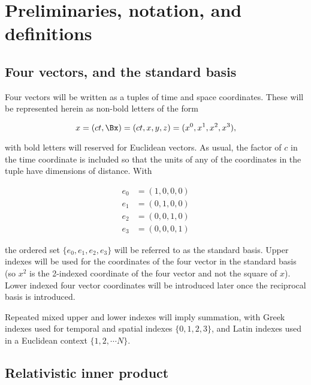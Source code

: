 
\section{Preliminaries, notation, and definitions}

\subsection{Four vectors, and the standard basis}

Four vectors will be written as a tuples of time and space coordinates.  These will be represented herein as non-bold letters of the form

\begin{equation}\label{eqn:gramSchmidtLorentz:10}
x = (c t, \Bx) = ( c t, x, y, z ) = ( x^0, x^1, x^2, x^3 ),
\end{equation}

with bold letters will reserved for Euclidean vectors.  As usual, the factor of $c$ in the time coordinate is included so that the units of any of the coordinates in the tuple have dimensions of distance.  With

\begin{equation}\label{eqn:gramSchmidtLorentz:70}
\begin{aligned}
e_0 &= (1, 0, 0, 0) \\
e_1 &= (0, 1, 0, 0) \\
e_2 &= (0, 0, 1, 0) \\
e_3 &= (0, 0, 0, 1)
\end{aligned}
\end{equation}

the ordered set $\{e_0, e_1, e_2, e_3\}$ will be referred to as the standard basis.  Upper indexes will be used for the coordinates of the four vector in the standard basis (so $x^2$ is the 2-indexed coordinate of the four vector and not the square of $x$).  Lower indexed four vector coordinates will be introduced later once the reciprocal basis is introduced.

Repeated mixed upper and lower indexes will imply summation, with Greek indexes used for temporal and spatial indexes $\{0, 1, 2, 3\}$, and Latin indexes used in a Euclidean context $\{1, 2, \cdots N\}$.

\subsection{Relativistic inner product}

